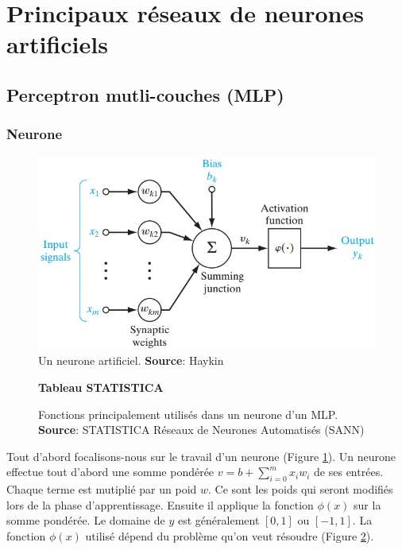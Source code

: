 \documentclass[12pt,a4paper,oneside, titlepage]{article}
\begin{document}
\section{Principaux réseaux de neurones artificiels}
\terminologie
\subsection{Perceptron mutli-couches (MLP)}
\subsubsection*{Neurone}
\begin{figure}
 \centering
 \includegraphics[scale=0.5]{../figures/neurone.jpg}
 \caption{Un neurone artificiel. \textbf{Source}: Haykin\cite{Haykin}}
 \label{neuronemlp}
\end{figure}
\begin{figure}
 \centering
 \textbf{Tableau STATISTICA}
 \caption{Fonctions principalement utilisés dans un neurone d'un MLP. \textbf{Source}: STATISTICA Réseaux de Neurones Automatisés (SANN)\cite{statistica}}
 \label{mlpfonc}
\end{figure}
Tout d'abord focalisons-nous sur le travail d'un neurone (Figure \ref{neuronemlp}).
Un neurone effectue tout d'abord une somme pondérée $v = b+\sum_{i=0}^{m}x_{i}w_{i}$ de ses entrées.
Chaque terme est mutiplié par un poid $w$. Ce sont les poids qui seront modifiés lors de la phase d'apprentissage.
Ensuite il applique la fonction $\phi(x)$ sur la somme pondérée.
Le domaine de $y$ est généralement $[0,1]$ ou $[-1,1]$.\cite{Haykin}
La fonction $\phi(x)$ utilisé dépend du problème qu'on veut résoudre (Figure \ref{mlpfonc}).
\end{document}
